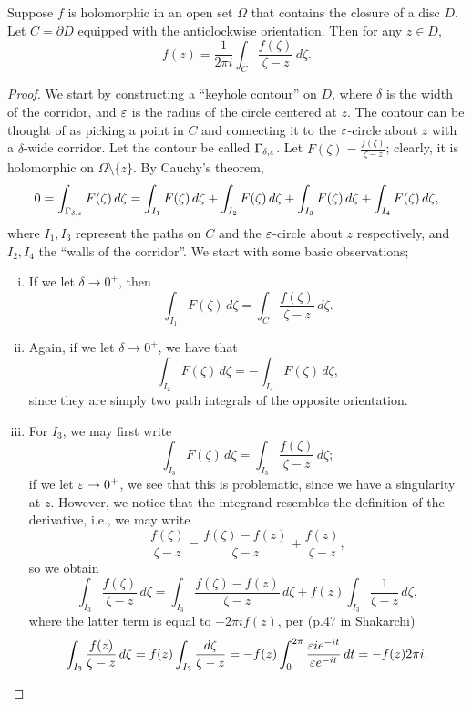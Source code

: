 \begin{theorem}
    Suppose $f$ is holomorphic in an open set $\Omega$ that contains the closure of a disc $D$. Let $C = \partial D$ equipped with the anticlockwise orientation. Then for any $z \in D$,
    \[ f(z) = \frac{1}{2\pi i} \int_C \frac{f(\zeta)}{\zeta - z} \, d\zeta. \]
\end{theorem}
\begin{proof}
    We start by constructing a ``keyhole contour'' on $D$, where $\delta$ is the width of the corridor, and $\varepsilon$ is the radius of the circle centered at $z$. The contour can be thought of as picking a point in $C$ and connecting it to the $\varepsilon$-circle about $z$ with a $\delta$-wide corridor. Let the contour be called $\Gamma_{\delta,\varepsilon}$. Let $F(\zeta) = \frac{f(\zeta)}{\zeta - z}$; clearly, it is holomorphic on $\Omega \setminus \{z\}$. By Cauchy's theorem,
    \[ 0 = \int_{\Gamma_{\delta,\varepsilon}} F(\zeta) \, d\zeta = \int_{I_1} F(\zeta) \, d\zeta + \int_{I_2} F(\zeta) \, d\zeta + \int_{I_3} F(\zeta) \, d\zeta + \int_{I_4} F(\zeta) \, d\zeta, \]
    where $I_1, I_3$ represent the paths on $C$ and the $\varepsilon$-circle about $z$ respectively, and $I_2, I_4$ the ``walls of the corridor''. We start with some basic observations;
    \begin{enumerate}[(i)]
        \item If we let $\delta \to 0^+$, then
        \[ \int_{I_1} F(\zeta) \, d\zeta = \int_C \frac{f(\zeta)}{\zeta - z} \, d\zeta. \]
        \item Again, if we let $\delta \to 0^+$, we have that
        \[ \int_{I_2} F(\zeta) \, d\zeta = -\int_{I_4} F(\zeta) \, d\zeta, \]
        since they are simply two path integrals of the opposite orientation.
        \item For $I_3$, we may first write
        \[ \int_{I_3} F(\zeta) \, d\zeta = \int_{I_3} \frac{f(\zeta)}{\zeta - z} \, d\zeta; \]
        if we let $\varepsilon \to 0^+$, we see that this is problematic, since we have a singularity at $z$. However, we notice that the integrand resembles the definition of the derivative, i.e., we may write
        \[ \frac{f(\zeta)}{\zeta - z} = \frac{f(\zeta) - f(z)}{\zeta - z} + \frac{f(z)}{\zeta - z}, \]
        so we obtain
        \[ \int_{I_3} \frac{f(\zeta)}{\zeta - z} \, d\zeta = \int_{I_3} \frac{f(\zeta) - f(z)}{\zeta - z} \, d\zeta + f(z) \int_{I_3} \frac{1}{\zeta - z} \, d\zeta, \]
        where the latter term is equal to $-2\pi i f(z)$, per (p.47 in Shakarchi)
        \[ \int_{I_3} \frac{f(z)}{\zeta - z} \, d\zeta = f(z) \int_{I_3} \frac{d\zeta}{\zeta - z} = -f(z) \int_0^{2\pi} \frac{\varepsilon ie^{-it}}{\varepsilon e^{-it}} \, dt = -f(z) 2\pi i. \]

\end{enumerate}
\end{proof}
